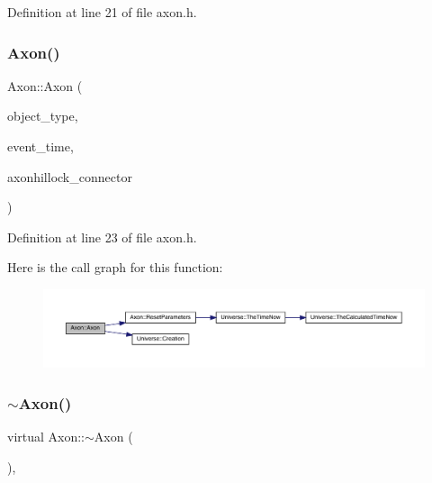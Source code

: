 Definition at line 21 of file axon.\+h.

\mbox{\label{class_axon_afaffed720efb3cb75e46088c5fb81d95}} 
\subsubsection{\texorpdfstring{Axon()}{Axon()}\hspace{0.1cm}{\footnotesize\ttfamily [4/4]}}
{\footnotesize\ttfamily Axon\+::\+Axon (\begin{DoxyParamCaption}\item[{unsigned int}]{object\+\_\+type,  }\item[{std\+::chrono\+::time\+\_\+point$<$ \hyperlink{universe_8h_a0ef8d951d1ca5ab3cfaf7ab4c7a6fd80}{Clock} $>$}]{event\+\_\+time,  }\item[{\hyperlink{class_axon_hillock}{Axon\+Hillock} \&}]{axonhillock\+\_\+connector }\end{DoxyParamCaption})\hspace{0.3cm}{\ttfamily [inline]}}



Definition at line 23 of file axon.\+h.

Here is the call graph for this function\+:
\nopagebreak
\begin{figure}[H]
\begin{center}
\leavevmode
\includegraphics[width=350pt]{class_axon_afaffed720efb3cb75e46088c5fb81d95_cgraph}
\end{center}
\end{figure}
\mbox{\label{class_axon_af000507f0ff0527d1743e90d2e756282}} 
\subsubsection{\texorpdfstring{$\sim$\+Axon()}{~Axon()}}
{\footnotesize\ttfamily virtual Axon\+::$\sim$\+Axon (\begin{DoxyParamCaption}{ }\end{DoxyParamCaption})\hspace{0.3cm}{\ttfamily [inline]}, {\ttfamily [virtual]}}

